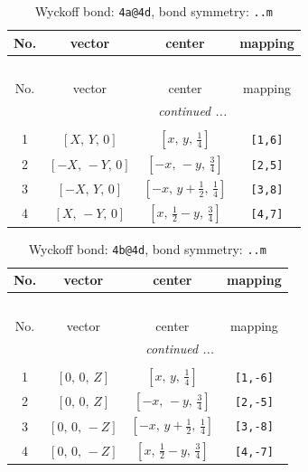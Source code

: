 \documentclass[fleqn,8pt]{jsarticle}
\begin{document}
\begin{longtable}{cccc}
\caption{Wyckoff bond: {\tt 4a@4d}, bond symmetry: {\tt ..m}}
 \\
 \hline \hline
No. & vector & center & mapping \\ \hline \endfirsthead

\multicolumn{3}{l}{\tablename\ \thetable{}} \\
 \hline \hline
No. & vector & center & mapping \\ \hline \endhead

 \hline \hline
\multicolumn{3}{r}{\footnotesize\it continued ...} \\ \endfoot

 \hline \hline
\multicolumn{3}{r}{} \\ \endlastfoot

1 & $\left[ X,\, Y,\, 0 \right]$ & $\left[ x,\, y,\, \frac{1}{4} \right]$ & {\tt [1,6]} \\ \hline
2 & $\left[ - X,\, - Y,\, 0 \right]$ & $\left[ - x,\, - y,\, \frac{3}{4} \right]$ & {\tt [2,5]} \\ \hline
3 & $\left[ - X,\, Y,\, 0 \right]$ & $\left[ - x,\, y + \frac{1}{2},\, \frac{1}{4} \right]$ & {\tt [3,8]} \\ \hline
4 & $\left[ X,\, - Y,\, 0 \right]$ & $\left[ x,\, \frac{1}{2} - y,\, \frac{3}{4} \right]$ & {\tt [4,7]} \\
\end{longtable}
\renewcommand{\arraystretch}{1.2}
\begin{longtable}{cccc}
\caption{Wyckoff bond: {\tt 4b@4d}, bond symmetry: {\tt ..m}}
 \\
 \hline \hline
No. & vector & center & mapping \\ \hline \endfirsthead

\multicolumn{3}{l}{\tablename\ \thetable{}} \\
 \hline \hline
No. & vector & center & mapping \\ \hline \endhead

 \hline \hline
\multicolumn{3}{r}{\footnotesize\it continued ...} \\ \endfoot

 \hline \hline
\multicolumn{3}{r}{} \\ \endlastfoot

1 & $\left[ 0,\, 0,\, Z \right]$ & $\left[ x,\, y,\, \frac{1}{4} \right]$ & {\tt [1,-6]} \\ \hline
2 & $\left[ 0,\, 0,\, Z \right]$ & $\left[ - x,\, - y,\, \frac{3}{4} \right]$ & {\tt [2,-5]} \\ \hline
3 & $\left[ 0,\, 0,\, - Z \right]$ & $\left[ - x,\, y + \frac{1}{2},\, \frac{1}{4} \right]$ & {\tt [3,-8]} \\ \hline
4 & $\left[ 0,\, 0,\, - Z \right]$ & $\left[ x,\, \frac{1}{2} - y,\, \frac{3}{4} \right]$ & {\tt [4,-7]} \\
\end{longtable}
\end{document}
